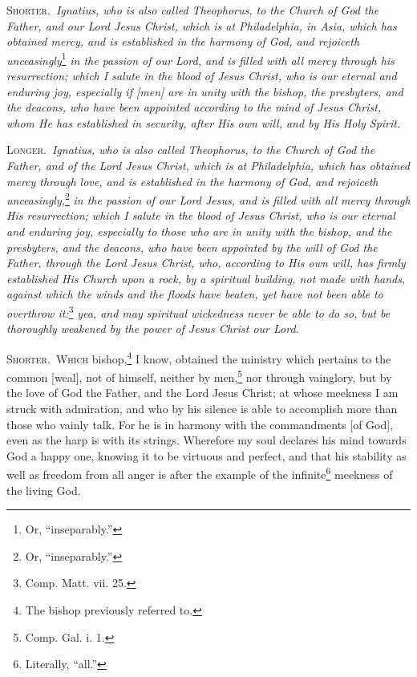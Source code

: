 
\textsc{Shorter.}~\emph{Ignatius, who is also called Theophorus, to the Church of God the Father, and our Lord Jesus Christ, which is at Philadelphia, in Asia, which has obtained mercy, and is established in the harmony of God, and rejoiceth unceasingly}\footnote{Or, “inseparably.”}\emph{ in the passion of our Lord, and is filled with all mercy through his resurrection; which I salute in the blood of Jesus Christ, who is our eternal and enduring joy, especially if [men] are in unity with the bishop, the presbyters, and the deacons, who have been appointed according to the mind of Jesus Christ, whom He has established in security, after His own will, and by His Holy Spirit.}

\textsc{Longer.}~\emph{Ignatius, who is also called Theophorus, to the Church of God the Father, and of the Lord Jesus Christ, which is at Philadelphia, which has obtained mercy through love, and is established in the harmony of God, and rejoiceth unceasingly,}\footnote{Or, “inseparably.”}\emph{ in the passion of our Lord Jesus, and is filled with all mercy through His resurrection; which I salute in the blood of Jesus Christ, who is our eternal and enduring joy, especially to those who are in unity with the bishop, and the presbyters, and the deacons, who have been appointed by the will of God the Father, through the Lord Jesus Christ, who, according to His own will, has firmly established His Church upon a rock, by a spiritual building, not made with hands, against which the winds and the floods have beaten, yet have not been able to overthrow it:}\footnote{Comp. Matt. vii. 25.}\emph{ yea, and may spiritual wickedness never be able to do so, but be thoroughly weakened by the power of Jesus Christ our Lord.}


\textsc{Shorter.}~\textsc{Which} bishop,\footnote{The bishop previously referred to.} I know, obtained the ministry which pertains to the common [weal], not of himself, neither by men,\footnote{Comp. Gal. i. 1.} nor through vainglory, but by the love of God the Father, and the Lord Jesus Christ; at whose meekness I am struck with admiration, and who by his silence is able to accomplish more than those who vainly talk. For he is in harmony with the commandments [of God], even as the harp is with its strings. Wherefore my soul declares his mind towards God a happy one, knowing it to be virtuous and perfect, and that his stability as well as freedom from all anger is after the example of the infinite\footnote{Literally, “all.”} meekness of the living God.

